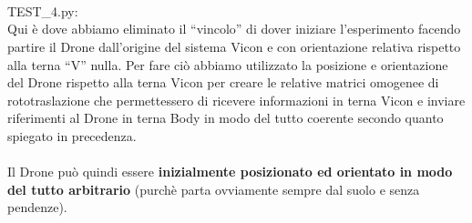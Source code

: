 \\
\\
\\
TEST\_4.py:
\\
Qui è dove abbiamo eliminato il “vincolo” di dover iniziare l’esperimento facendo partire il Drone dall’origine del sistema Vicon e con orientazione relativa rispetto alla terna “V” nulla. 
Per fare ciò abbiamo utilizzato la posizione e orientazione del Drone rispetto alla terna Vicon per creare le relative matrici omogenee di rototraslazione che permettessero di ricevere informazioni in terna Vicon e inviare riferimenti al Drone in terna Body in modo del tutto coerente secondo quanto spiegato in precedenza.
\\
\\
Il Drone può quindi essere \textbf{inizialmente posizionato ed orientato in modo del tutto arbitrario} (purchè parta ovviamente sempre dal suolo e senza pendenze).  
\\
\\
